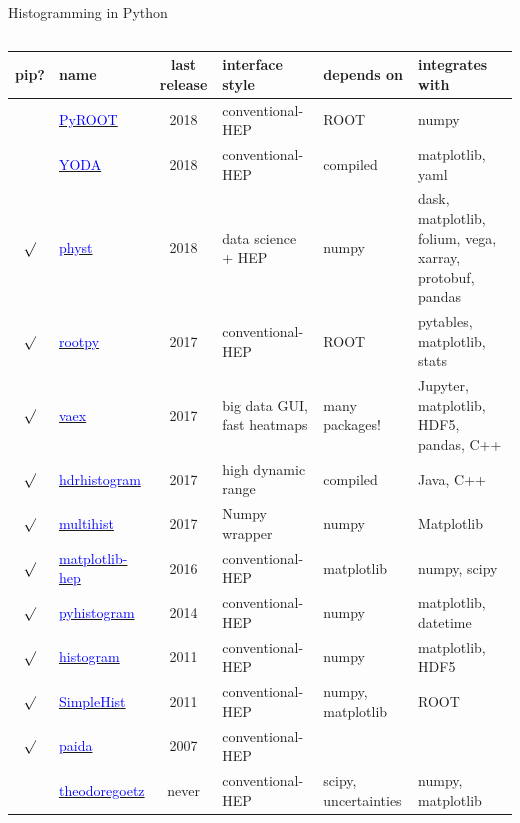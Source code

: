 \documentclass[aspectratio=169]{beamer}
\begin{document}
\begin{frame}{Histogramming in Python}
\scriptsize
\vspace{0.25 cm}
\begin{columns}
\begin{tabular}{c l c p{2.5 cm} p{2 cm} p{4 cm}}
pip? & name & last release & interface style & depends on & integrates with \\\hline
& \href{https://root.cern.ch/pyroot}{\textcolor{blue}{PyROOT}} & 2018 & conventional-HEP & ROOT & numpy \\
& \href{https://yoda.hepforge.org/pydoc}{\textcolor{blue}{YODA}} & 2018 & conventional-HEP & compiled & matplotlib, yaml \\
$\surd$ & \href{https://pypi.python.org/pypi/physt}{\textcolor{blue}{physt}} & 2018 & data science + HEP & numpy & dask, matplotlib, folium, vega, xarray, protobuf, pandas \\
$\surd$ & \href{https://pypi.org/project/rootpy}{\textcolor{blue}{rootpy}} & 2017 & conventional-HEP & ROOT & pytables, matplotlib, stats \\
$\surd$ & \href{https://vaex.io}{\textcolor{blue}{vaex}} & 2017 & big data GUI, fast heatmaps & many packages! & Jupyter, matplotlib, HDF5, pandas, C++ \\
$\surd$ & \href{https://pypi.python.org/pypi/hdrhistogram}{\textcolor{blue}{hdrhistogram}} & 2017 & high dynamic range & compiled & Java, C++ \\
$\surd$ & \href{https://pypi.python.org/pypi/multihist}{\textcolor{blue}{multihist}} & 2017 & Numpy wrapper & numpy & Matplotlib \\
$\surd$ & \href{https://github.com/ibab/matplotlib-hep}{\textcolor{blue}{matplotlib-hep}} & 2016 & conventional-HEP & matplotlib & numpy, scipy \\
$\surd$ & \href{https://pypi.python.org/pypi/pyhistogram}{\textcolor{blue}{pyhistogram}} & 2014 & conventional-HEP & numpy & matplotlib, datetime \\
$\surd$ & \href{https://pypi.python.org/pypi/histogram}{\textcolor{blue}{histogram}} & 2011 & conventional-HEP & numpy & matplotlib, HDF5 \\
$\surd$ & \href{https://pypi.python.org/pypi/SimpleHist}{\textcolor{blue}{SimpleHist}} & 2011 & conventional-HEP & numpy, matplotlib & ROOT \\
$\surd$ & \href{https://pypi.org/project/paida}{\textcolor{blue}{paida}} & 2007 & conventional-HEP & & \\
& \href{https://github.com/theodoregoetz/histogram}{\textcolor{blue}{theodoregoetz}} & never & conventional-HEP & scipy, uncertainties & numpy, matplotlib \\

\end{tabular}
\end{columns}
\end{frame}
\end{document}
